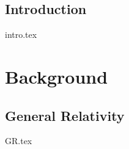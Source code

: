 \documentclass[UKenglish]{texmex/uiomasterthesis}
\begin{document}








\chapter{Introduction}\label{chap:intro}
    {intro.tex}







\part{Background}\label{part:bckg}


\chapter{General Relativity}\label{chap:GR}
    {{GR.tex}}
\end{document}
